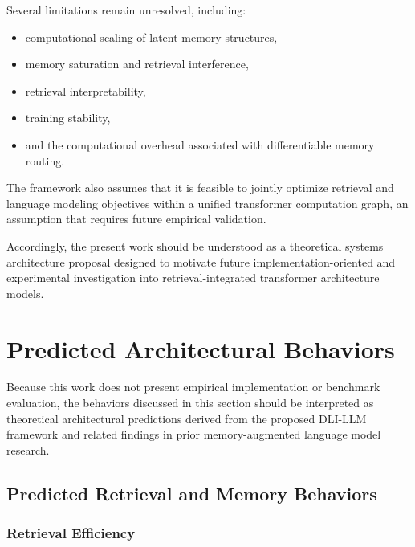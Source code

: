 \documentclass[
]{article}
\begin{document}
Several limitations remain unresolved, including:

\begin{itemize}
\item
  computational scaling of latent memory structures,
\item
  memory saturation and retrieval interference,
\item
  retrieval interpretability,
\item
  training stability,
\item
  and the computational overhead associated with differentiable memory
  routing.
\end{itemize}

The framework also assumes that it is feasible to jointly optimize
retrieval and language modeling objectives within a unified transformer
computation graph, an assumption that requires future empirical
validation.

Accordingly, the present work should be understood as a theoretical
systems architecture proposal designed to motivate future
implementation-oriented and experimental investigation into
retrieval-integrated transformer architecture models.

\hypertarget{predicted-architectural-behaviors}{%
\section{Predicted Architectural
Behaviors}\label{predicted-architectural-behaviors}}

Because this work does not present empirical implementation or benchmark
evaluation, the behaviors discussed in this section should be
interpreted as theoretical architectural predictions derived from the
proposed DLI-LLM framework and related findings in prior
memory-augmented language model research.

\hypertarget{predicted-retrieval-and-memory-behaviors}{%
\subsection{\texorpdfstring{ Predicted Retrieval and Memory
Behaviors}{ Predicted Retrieval and Memory Behaviors}}\label{predicted-retrieval-and-memory-behaviors}}

\hypertarget{retrieval-efficiency}{%
\subsubsection{Retrieval Efficiency}\label{retrieval-efficiency}}
\end{document}
